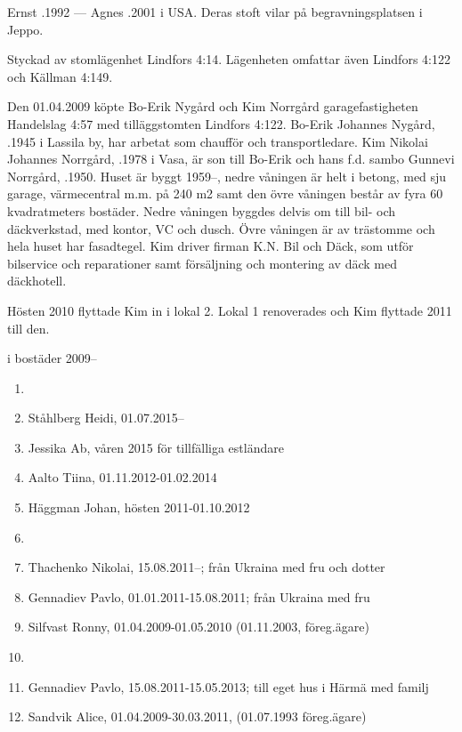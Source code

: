 Ernst .1992  ---  Agnes .2001 i USA. Deras stoft vilar på begravningsplatsen i Jeppo.




Styckad av stomlägenhet Lindfors 4:14. Lägenheten omfattar även Lindfors 4:122 och Källman 4:149.



Den 01.04.2009 köpte Bo-Erik Nygård och Kim Norrgård garagefastigheten Handelslag 4:57 med tilläggstomten Lindfors 4:122. Bo-Erik Johannes Nygård, .1945 i Lassila by, har arbetat som chaufför och transportledare. Kim Nikolai Johannes Norrgård, .1978 i Vasa, är son till Bo-Erik och hans f.d. sambo Gunnevi Norrgård, .1950. Huset är byggt 1959--, nedre våningen är helt i betong, med sju garage, värmecentral m.m. på 240 m2 samt den övre våningen består av fyra 60 kvadratmeters bostäder. Nedre våningen byggdes delvis om till bil- och däckverkstad, med kontor, VC och dusch. Övre våningen är av trästomme och hela huset har fasadtegel. Kim driver firman K.N. Bil och Däck, som utför bilservice och reparationer samt försäljning och montering av däck med däckhotell.

Hösten 2010 flyttade Kim in i lokal 2. Lokal 1 renoverades och Kim flyttade 2011 till den.

 i bostäder 2009--
\begin{enumerate}
  \item {}
  \item Ståhlberg Heidi,	01.07.2015--
  \item Jessika Ab, våren 2015 för tillfälliga estländare
  \item Aalto Tiina, 01.11.2012-01.02.2014
  \item Häggman Johan,	hösten 2011-01.10.2012
  \item {}
  \item Thachenko Nikolai, 15.08.2011--; från Ukraina	med fru och dotter
  \item Gennadiev Pavlo,	01.01.2011-15.08.2011; från Ukraina	med fru
  \item Silfvast Ronny,	01.04.2009-01.05.2010 (01.11.2003, föreg.ägare)
  \item {}
  \item Gennadiev Pavlo, 15.08.2011-15.05.2013; till eget hus i Härmä med familj
  \item Sandvik Alice,	01.04.2009-30.03.2011, (01.07.1993 föreg.ägare)
\end{enumerate}

